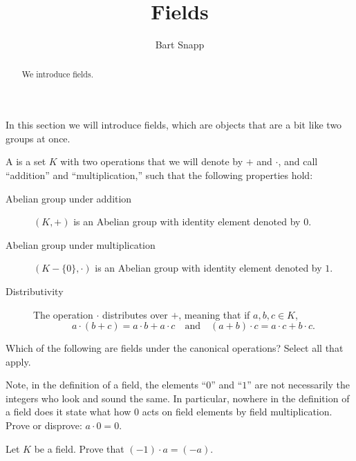 \documentclass{ximera}
\author{Bart Snapp}
\title{Fields}
\begin{document}
\begin{abstract}
  We introduce fields.
\end{abstract}
\maketitle

In this section we will introduce fields, which are objects that are a
bit like two groups at once.


\begin{definition}
  A  is a set $K$ with two operations that we will denote
  by $+$ and $\cdot$, and call ``addition'' and ``multiplication,'' such that
  the following properties hold:
  \begin{description}
  \item[Abelian group under addition] $(K,+)$ is an Abelian
    group with identity element denoted by $0$.
  \item[Abelian group under multiplication] $(K-\{0\},\cdot)$ is
    an Abelian group with identity element denoted by $1$.
  \item[Distributivity] The operation $\cdot$ distributes over $+$,
    meaning that if $a,b,c\in K$,
    \[
    a\cdot (b+ c) = a\cdot b+ a\cdot c \quad\text{and}\quad (a+ b)\cdot c  = a\cdot c+ b\cdot c.
    \]
  \end{description}
\end{definition}

\begin{exercise} 
  Which of the following are fields under the canonical operations?
  Select all that apply.
  \begin{selectAll}
    \choice[correct]{$\Q$}
    \choice[correct]{$\R$}
    \choice[correct]{$\C$}
    \choice{$\Z$}
  \end{selectAll}
\end{exercise}




\begin{exercise}
  Note, in the definition of a field, the elements ``$0$'' and ``$1$''
  are not necessarily the integers who look and sound the same. In
  particular, nowhere in the definition of a field does it state what
  how $0$ acts on field elements by field multiplication. Prove or
  disprove: $a\cdot 0 = 0$.
\end{exercise}

\begin{exercise}
  Let $K$ be a field. Prove that $(-1)\cdot a = (-a)$.
\end{exercise}
\end{document}
